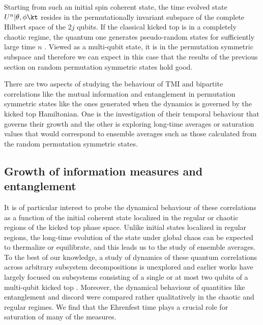 \documentclass[pre,aps,showpacs,showkeys,twocolumn]{revtex4-1}
\theoremstyle{definition}
\theoremstyle{remark}
\begin{document}
Starting from such an initial spin coherent state, the time evolved state $U^n|\theta,\phi\kt$ resides in the permutationally invariant subspace of the complete Hilbert space of the $2j$ qubits. If the classical kicked top is in a completely chaotic regime, the quantum one generates pseudo-random states for sufficiently large time $n$ \cite{Haake}. Viewed as a multi-qubit state, it is in the permutation symmetric subspace and therefore we can expect in this case that the results of the previous section on random permutation symmetric states hold good.

There are two aspects of studying the behaviour of TMI and bipartite correlations like the mutual information and entanglement in permutation symmetric states like the ones generated when the dynamics is governed by the kicked top Hamiltonian. One is the investigation of their temporal behaviour that governs their growth and the other is exploring long-time averages or saturation values that would correspond to ensemble averages such as those calculated from the random permutation symmetric states.

\subsection{Growth of information measures and entanglement}

It is of particular interest to probe the dynamical behaviour of these correlations as a function of the initial coherent state localized in the regular or chaotic regions of the kicked top phase space. Unlike initial states localized in regular regions, the long-time evolution of the state under global chaos can be expected to thermalize or equilibrate, and this leads us to the study of ensemble averages. To the best of our knowledge, a study of dynamics of these quantum correlations across arbitrary subsystem decompositions is unexplored and earlier works have largely focused on subsystems consisting of a single or at most two qubits of a multi-qubit kicked top \cite{Wang2004, madhok2015signatures}. Moreover, the dynamical behaviour of quantities like entanglement and discord were compared rather qualitatively in the chaotic and regular regimes. We find that the Ehrenfest time plays a crucial role for saturation of many of the measures.
 
\end{document}
